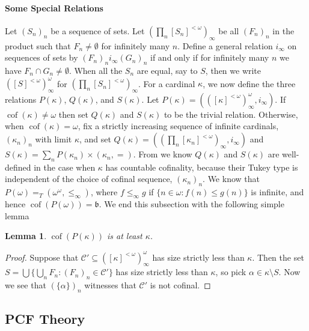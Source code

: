 \documentclass{article}
\newtheorem{lem}[thm]{Lemma}
\newcommand{\te}{=_T}
\newcommand{\omom}{\omega^\omega}
\DeclareMathOperator{\cof}{cof}
\begin{document}
\paragraph{Some Special Relations} 
Let $(S_n)_n$ be a sequence of sets. Let $\left(\prod_n [S_n]^{<\omega}\right)_\infty$ be all $(F_n)_n$ in the product such that $F_n\ne \emptyset$ for infinitely many $n$.
Define a general relation $i_\infty$ on sequences of sets by $(F_n)_n i_\infty (G_n)_n$ if and only if for infinitely many $n$ we have $F_n \cap G_n \ne \emptyset$. 
When all the $S_n$ are equal, say to $S$, then we write $\left([S]^{<\omega}\right)^{\omega}_\infty$ for $\left(\prod_n [S_n]^{<\omega}\right)_\infty$. 
For a cardinal $\kappa$, we now define the three relations $P(\kappa)$, $Q(\kappa)$, and $S(\kappa)$. Let $P(\kappa)=(\left([\kappa]^{<\omega}\right)^{\omega}_\infty,i_\infty)$. 
If $\cof(\kappa) \ne \omega$ then set $Q(\kappa)$ and $S(\kappa)$ to be the trivial relation. Otherwise, when $\cof(\kappa)=\omega$, fix a strictly  increasing sequence of infinite cardinals, $(\kappa_n)_n$ with limit $\kappa$, and set $Q(\kappa)=(\left(\prod_n [\kappa_n]^{<\omega}\right)_\infty,i_\infty)$ and  $S(\kappa)=\sum_n P(\kappa_n) \times (\kappa_n,=)$. 
From \cite[Lemma~2.14]{FG_Shape} we know $Q(\kappa)$ and $S(\kappa)$ are well-defined in the case when $\kappa$ has countable cofinality, because their  Tukey type is independent of the choice of cofinal sequence, $(\kappa_n)_n$.
We know \cite[Lemma~2.10]{FG_Shape} that $P(\omega) \te (\omom,\le_\infty)$, where $f \le_\infty g$ if $\{n \in \omega : f(n) \le g(n)\}$ is infinite, and hence $\cof(P(\omega))=\mathfrak{b}$. We end this subsection with the following simple lemma
\begin{lem}\label{lem:cofatleastkappa}
    $\cof(P(\kappa))$ is at least $\kappa$. 
\end{lem}
    \begin{proof} Suppose that $\mathcal{C}' \subseteq ([\kappa]^{<\omega})^{\omega}_{\infty}$ has size strictly less than $\kappa$. Then the set $S=\bigcup \{ \bigcup_n F_n : (F_n)_n \in \mathcal{C}'\}$ has size strictly less than $\kappa$, so pick $\alpha \in \kappa \setminus S$. 
Now we see that $(\{\alpha\})_n$ witnesses that $\mathcal{C}'$ is not cofinal.
\end{proof}




\subsection{\textsc{PCF} Theory}\label{ssec:pcf} 
\end{document}
